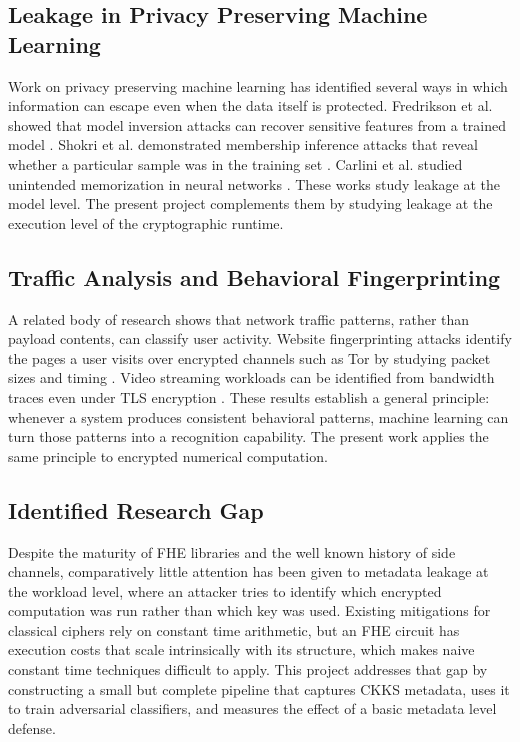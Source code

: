 \documentclass[12pt,a4paper]{article}
\begin{document}
\subsection{Leakage in Privacy Preserving Machine Learning}
Work on privacy preserving machine learning has identified several ways in which information can escape even when the data itself is protected. Fredrikson et al. showed that model inversion attacks can recover sensitive features from a trained model \cite{fredrikson2015model}. Shokri et al. demonstrated membership inference attacks that reveal whether a particular sample was in the training set \cite{shokri2017membership}. Carlini et al. studied unintended memorization in neural networks \cite{carlini2019secret}. These works study leakage at the model level. The present project complements them by studying leakage at the execution level of the cryptographic runtime.

\subsection{Traffic Analysis and Behavioral Fingerprinting}
A related body of research shows that network traffic patterns, rather than payload contents, can classify user activity. Website fingerprinting attacks identify the pages a user visits over encrypted channels such as Tor by studying packet sizes and timing \cite{panchenko2016website}. Video streaming workloads can be identified from bandwidth traces even under TLS encryption \cite{schuster2017beauty}. These results establish a general principle: whenever a system produces consistent behavioral patterns, machine learning can turn those patterns into a recognition capability. The present work applies the same principle to encrypted numerical computation.

\subsection{Identified Research Gap}
Despite the maturity of FHE libraries and the well known history of side channels, comparatively little attention has been given to metadata leakage at the workload level, where an attacker tries to identify which encrypted computation was run rather than which key was used. Existing mitigations for classical ciphers rely on constant time arithmetic, but an FHE circuit has execution costs that scale intrinsically with its structure, which makes naive constant time techniques difficult to apply. This project addresses that gap by constructing a small but complete pipeline that captures CKKS metadata, uses it to train adversarial classifiers, and measures the effect of a basic metadata level defense.
\end{document}
